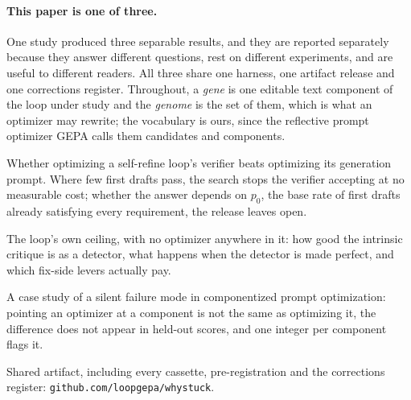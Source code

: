 
\paragraph{This paper is one of three.}
One study produced three separable results, and they are reported separately because they answer
different questions, rest on different experiments, and are useful to different readers. All three
share one harness, one artifact release and one corrections register. Throughout, a
\emph{gene} is one editable text component of the loop under study and the \emph{genome} is
the set of them, which is what an optimizer may rewrite; the vocabulary is ours, since the reflective
prompt optimizer GEPA \citep{agrawal2025gepa} calls them candidates and components.
\begin{description}\itemsep0pt
  \item[I. The evolved verifier.] Whether optimizing a self-refine loop's verifier beats
    optimizing its generation prompt. Where few first drafts pass, the search stops the verifier
    accepting at no measurable cost; whether the answer depends on $p_0$, the base rate of
    first drafts already satisfying every requirement, the release leaves open.
  \item[II. What a checker cannot buy is the repair.] The loop's own ceiling, with no optimizer
    anywhere in it: how good the intrinsic critique is as a detector, what happens when the
    detector is made perfect, and which fix-side levers actually pay.
  \item[III. A loop optimizer that was not optimizing its loop.] A case study of a silent failure
    mode in componentized prompt optimization: pointing an optimizer at a component is not the same as
    optimizing it, the difference does not appear in held-out scores, and one integer per component
    flags it.
\end{description}
Shared artifact, including every cassette, pre-registration and the corrections register:
\texttt{github.com/loopgepa/whystuck}.
